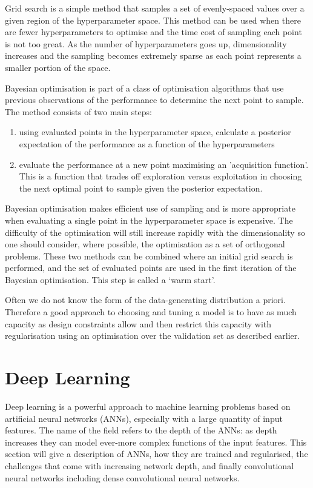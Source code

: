 Grid search is a simple method that samples a set of evenly-spaced values over a given region of the hyperparameter space. 
This method can be used when there are fewer hyperparameters to optimise and the time cost of sampling each point is not too great. 
As the number of hyperparameters goes up, dimensionality increases and the sampling becomes extremely sparse as each point represents a smaller portion of the space.

Bayesian optimisation \cite{BayesOpt} is part of a class of optimisation algorithms that use previous observations of the performance to determine the next point to sample. 
The method consists of two main steps:
\begin{enumerate}[noitemsep]
    \item using evaluated points in the hyperparameter space, calculate a posterior expectation of the performance as a function of the hyperparameters
    \item evaluate the performance at a new point maximising an 'acquisition function'. This is a function that trades off exploration versus exploitation in choosing the next optimal point to sample given the posterior expectation.
\end{enumerate}
Bayesian optimisation makes efficient use of sampling and is more appropriate when evaluating a single point in the hyperparameter space is expensive. The difficulty of the optimisation will still increase rapidly with the dimensionality so one should consider, where possible, the optimisation as a set of orthogonal problems.  
These two methods can be combined where an initial grid search is performed, and the set of evaluated points are used in the first iteration of the Bayesian optimisation. 
This step is called a `warm start'. 

Often we do not know the form of the data-generating distribution a priori. Therefore a good approach to choosing and tuning a model is to have as much capacity as design constraints allow and then restrict this capacity with regularisation using an optimisation over the validation set as described earlier.

\section{Deep Learning}
Deep learning is a powerful approach to machine learning problems based on artificial neural networks (ANNs), especially with a large quantity of input features. 
The name of the field refers to the depth of the ANNs: as depth increases they can model ever-more complex functions of the input features. 
This section will give a description of ANNs, how they are trained and regularised, the challenges that come with increasing network depth, and finally convolutional neural networks including dense convolutional neural networks.  

